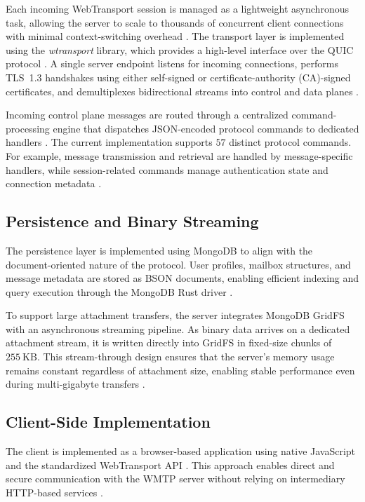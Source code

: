 \documentclass[10pt,a4paper]{article}
\begin{document}
Each incoming WebTransport session is managed as a
lightweight asynchronous task, allowing the server to scale
to thousands of concurrent client connections with minimal
context-switching overhead \cite{rustasync}. The transport layer is
implemented using the \textit{wtransport} library, which
provides a high-level interface over the QUIC protocol
\cite{quic}. A single server endpoint listens for incoming
connections, performs TLS~1.3 handshakes \cite{tls13} using
either self-signed or certificate-authority (CA)-signed
certificates, and demultiplexes bidirectional streams into
control and data planes \cite{quic, webtransport}.

Incoming control plane messages are routed through a
centralized command-processing engine that dispatches
JSON-encoded protocol commands to dedicated handlers
\cite{jmap}. The current implementation supports
$57$ distinct protocol commands. For example, message
transmission and retrieval are handled by message-specific
handlers, while session-related commands manage
authentication state and connection metadata
\cite{smtp, imap}.

\subsection{Persistence and Binary Streaming}

The persistence layer is implemented using MongoDB
\cite{mongodb2024} to align with the document-oriented nature of
the protocol. User profiles, mailbox structures, and message
metadata are stored as BSON documents, enabling efficient
indexing and query execution through the MongoDB Rust
driver \cite{klabnik2019, mongodb2024}.

To support large attachment transfers, the server integrates
MongoDB GridFS \cite{gridfs2024} with an asynchronous streaming
pipeline. As binary data arrives on a dedicated attachment
stream, it is written directly into GridFS in fixed-size chunks
of $255~\mathrm{KB}$. This stream-through design ensures that
the server’s memory usage remains constant regardless of
attachment size, enabling stable performance even during
multi-gigabyte transfers \cite{mongodb2024, gridfs2024}.

\subsection{Client-Side Implementation}

The client is implemented as a browser-based application
using native JavaScript and the standardized WebTransport
API \cite{webtransport}. This approach enables direct and
secure communication with the WMTP server without relying
on intermediary HTTP-based services \cite{http3}.
\end{document}

